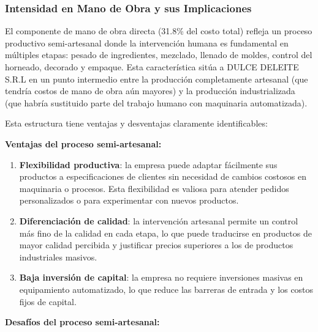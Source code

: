 \documentclass[
  stu,
  floatsintext,
  longtable,
  a4paper,
  nolmodern,
  notxfonts,
  notimes,
  12pt,
  colorlinks=true,linkcolor=blue,citecolor=blue,urlcolor=blue]{apa7}
\begin{document}
\subsubsection{Intensidad en Mano de Obra y sus
Implicaciones}\label{intensidad-en-mano-de-obra-y-sus-implicaciones}

El componente de mano de obra directa (31.8\% del costo total) refleja
un proceso productivo semi-artesanal donde la intervención humana es
fundamental en múltiples etapas: pesado de ingredientes, mezclado,
llenado de moldes, control del horneado, decorado y empaque. Esta
característica sitúa a DULCE DELEITE S.R.L en un punto intermedio entre
la producción completamente artesanal (que tendría costos de mano de
obra aún mayores) y la producción industrializada (que habría sustituido
parte del trabajo humano con maquinaria automatizada).

Esta estructura tiene ventajas y desventajas claramente identificables:

\textbf{Ventajas del proceso semi-artesanal:}

\begin{enumerate}
\def\labelenumi{\arabic{enumi}.}
\item
  \textbf{Flexibilidad productiva}: la empresa puede adaptar fácilmente
  sus productos a especificaciones de clientes sin necesidad de cambios
  costosos en maquinaria o procesos. Esta flexibilidad es valiosa para
  atender pedidos personalizados o para experimentar con nuevos
  productos.
\item
  \textbf{Diferenciación de calidad}: la intervención artesanal permite
  un control más fino de la calidad en cada etapa, lo que puede
  traducirse en productos de mayor calidad percibida y justificar
  precios superiores a los de productos industriales masivos.
\item
  \textbf{Baja inversión de capital}: la empresa no requiere inversiones
  masivas en equipamiento automatizado, lo que reduce las barreras de
  entrada y los costos fijos de capital.
\end{enumerate}

\textbf{Desafíos del proceso semi-artesanal:}
\end{document}
